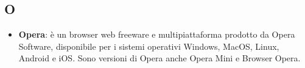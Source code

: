 \subsection{O}
\begin{itemize}
	\item
	\textbf{Opera}: è un browser web freeware e multipiattaforma prodotto da Opera Software, disponibile per i sistemi operativi Windows, MacOS, Linux, Android e iOS. Sono versioni di Opera anche Opera Mini e Browser Opera.
\end{itemize}